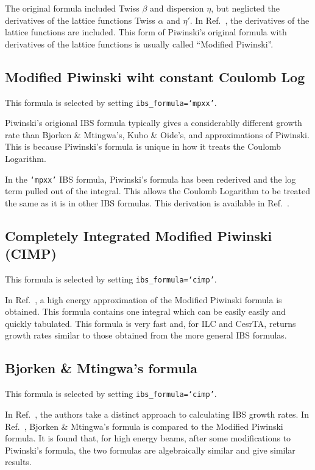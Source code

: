 \documentclass[11pt]{article}
\begin{document}
The original formula included Twiss $\beta$ and dispersion $\eta$, but neglicted
the derivatives of the lattice functions Twiss $\alpha$ and $\eta'$.
In Ref.~\cite{b:martini}, the derivatives of the lattice functions are included.
This form of Piwinski's original formula with derivatives of the lattice
functions is usually called ``Modified Piwinski''.

\subsection{Modified Piwinski wiht constant Coulomb Log}
This formula is selected by setting {\tt ibs_formula=`mpxx'}.

Piwinski's origional IBS formula typically gives a considerablly different growth rate than
Bjorken \& Mtingwa's, Kubo \& Oide's, and approximations of Piwinski.  This is because
Piwinski's formula is unique in how it treats the Coulomb Logarithm.

In the {\tt `mpxx'} IBS formula, Piwinski's formula has been rederived and the
log term pulled out of the integral.  This allows the Coulomb Logarithm to be treated the
same as it is in other IBS formulas.  This derivation is available in Ref.~\cite{b:ehr-thesis}.

\subsection{Completely Integrated Modified Piwinski (CIMP)}
This formula is selected by setting {\tt ibs_formula=`cimp'}.

In Ref.~\cite{b:wolski}, a high energy approximation of the Modified Piwinski formula is 
obtained.  This formula contains one integral which can be easily easily and quickly tabulated.
This formula is very fast and, for ILC and CesrTA, returns growth rates similar to those obtained
from the more general IBS formulas.

\subsection{Bjorken \& Mtingwa's formula}
This formula is selected by setting {\tt ibs_formula=`cimp'}.

In Ref.~\cite{b:bjmt}, the authors take a distinct approach to calculating IBS growth rates.
In Ref.~\cite{b:bane-comp}, Bjorken \& Mtingwa's formula is compared to
the Modified Piwinski formula.  It is found that, for high energy beams, after some
modifications to Piwinski's formula, the two formulas are algebraically similar
and give similar results.
\end{document}
